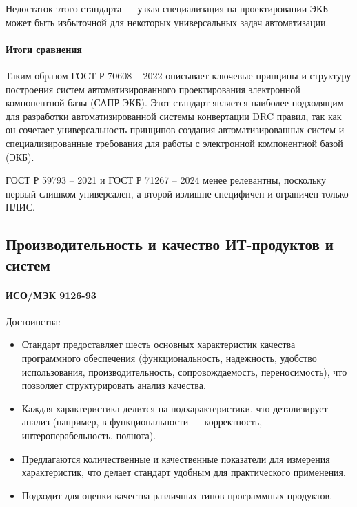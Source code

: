 Недостаток этого стандарта --- узкая специализация
на проектировании ЭКБ может быть избыточной
для некоторых универсальных задач автоматизации.

\paragraph{Итоги сравнения}

Таким образом ГОСТ Р 70608 -- 2022 описывает ключевые принципы
и структуру построения систем автоматизированного проектирования
электронной компонентной базы (САПР ЭКБ).
Этот стандарт является наиболее подходящим
для разработки автоматизированной системы конвертации DRC правил,
так как он сочетает универсальность принципов
создания автоматизированных систем
и специализированные требования
для работы с электронной компонентной базой (ЭКБ).

ГОСТ Р 59793 -- 2021 и ГОСТ Р 71267 -- 2024 менее релевантны,
поскольку первый слишком универсален,
а второй излишне специфичен и ограничен только ПЛИС.

\subsection{Производительность и качество ИТ-продуктов и систем}

\paragraph{ИСО/МЭК 9126-93}

Достоинства:

\begin{itemize}
	\item Стандарт предоставляет шесть основных характеристик
		качества программного обеспечения (функциональность, надежность,
		удобство использования, производительность,
		сопровождаемость, переносимость),
		что позволяет структурировать анализ качества.
	\item Каждая характеристика делится на подхарактеристики,
		что детализирует анализ (например,
		в функциональности --- корректность, интероперабельность, полнота).
	\item Предлагаются количественные и качественные показатели
		для измерения характеристик,
		что делает стандарт удобным для практического применения.
	\item Подходит для оценки качества различных типов программных продуктов.
\end{itemize}

